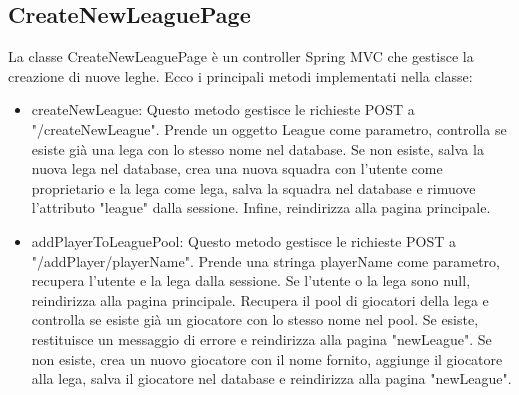 \documentclass[twoside,openright,titlepage,fleqn,headinclude,12pt,a4paper,BCOR=5mm,footinclude]{scrbook}
\begin{document}
\subsection{CreateNewLeaguePage} 
La classe CreateNewLeaguePage è un controller Spring MVC che gestisce la creazione di nuove leghe. Ecco i principali metodi implementati nella classe:  
\begin{itemize}
    \item createNewLeague: Questo metodo gestisce le richieste POST a "/createNewLeague". Prende un oggetto League come parametro, controlla se esiste già una lega con lo stesso nome nel database. Se non esiste, salva la nuova lega nel database, crea una nuova squadra con l'utente come proprietario e la lega come lega, salva la squadra nel database e rimuove l'attributo "league" dalla sessione. Infine, reindirizza alla pagina principale.
    \item addPlayerToLeaguePool: Questo metodo gestisce le richieste POST a "/addPlayer/{playerName}". Prende una stringa playerName come parametro, recupera l'utente e la lega dalla sessione. Se l'utente o la lega sono null, reindirizza alla pagina principale. Recupera il pool di giocatori della lega e controlla se esiste già un giocatore con lo stesso nome nel pool. Se esiste, restituisce un messaggio di errore e reindirizza alla pagina "newLeague". Se non esiste, crea un nuovo giocatore con il nome fornito, aggiunge il giocatore alla lega, salva il giocatore nel database e reindirizza alla pagina "newLeague".
\end{itemize}
\end{document}
